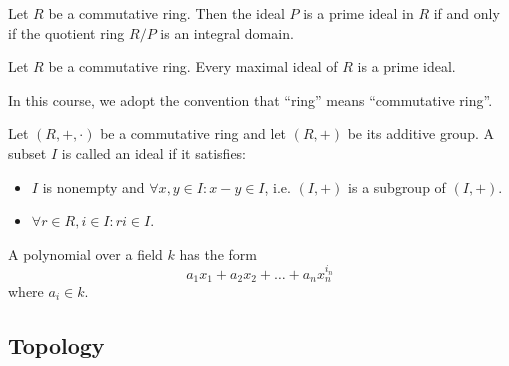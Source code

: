 \begin{prop}
  Let $R$ be a commutative ring. Then the ideal $P$ is a prime ideal in $R$ if
  and only if the quotient ring $R/P$ is an integral domain.
\end{prop}


\begin{prop}
  Let $R$ be a commutative ring. Every maximal ideal of $R$ is a prime ideal.
\end{prop}

\begin{remark}
  In this course, we adopt the convention that ``ring'' means ``commutative
  ring''.
\end{remark}


\begin{defn}
  Let $(R,+,\cdot)$ be a commutative ring and let $(R, +)$ be its additive
  group. A subset $I$ is called an ideal if it satisfies:
  \begin{itemize}
    \item $I$ is nonempty and $\forall x,y \in I : x-y \in I$, i.e. $(I,+)$ is a
    subgroup of $(I,+)$.
    \item $\forall r \in R, i \in I : ri \in I$.
  \end{itemize}
\end{defn}


\begin{defn}
  A polynomial over a field $k$ has the form
  \[ a_1 x_1 + a_2 x_2 + \ldots + a_n x_n^{i_n}\]
  where $a_i \in k$.
\end{defn}

\subsection{Topology}

\begin{defn}[Topology]
\end{defn}
